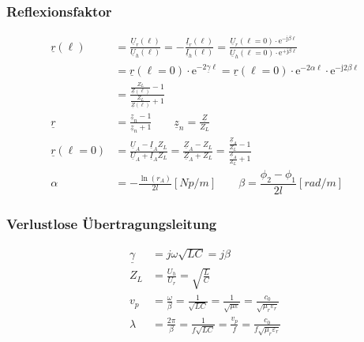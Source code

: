 \subsubsection{Reflexionsfaktor}
\begin{align*}
    \underline{r}(\ell)     & = \frac{\underline{U}_r(\ell)}{\underline{U}_h(\ell)} = -\frac{\underline{I}_r(\ell)}{\underline{I}_h(\ell)} = \frac{\underline{U}_r(\ell=0) \cdot \mathrm{e}^{-\mathrm{j} \beta \ell}}{\underline{U}_h(\ell=0) \cdot \mathrm{e}^{+\mathrm{j} \beta \ell}} \\
                            & = \underline{r}(\ell=0) \cdot \mathrm{e}^{-2 \underline{\gamma} \ell}=\underline{r}(\ell=0) \cdot \mathrm{e}^{-2 \alpha \ell} \cdot \mathrm{e}^{-\mathrm{j} 2 \beta \ell}\\
                            & = \frac{\frac{Z_L}{\underline{Z}(\ell)}-1}{\frac{Z_L}{\underline{Z}(\ell)}+1} \\
    \underline{r}           & = \frac{\underline{z}_n-1}{\underline{z}_n+1} \qquad \underline{z}_n=\frac{\underline{Z}}{Z_L}\\
    \underline{r}(\ell = 0) & = \frac{\underline{U}_A-\underline{I}_A Z_L}{\underline{U}_A + \underline{I}_A Z_L}=\frac{\underline{Z}_A-Z_L}{\underline{Z}_A+Z_L}=\frac{\frac{\underline{Z}_A}{Z_L}-1}{\frac{\underline{Z}_A}{Z_L}+1}\\
                    \alpha  & = -\frac{\ln(r_A)}{2l} [\si{Np/m}]  \qquad  \beta = \dfrac{\phi_2 -\phi_1}{2l} [\si{rad/m}]
\end{align*}

\subsubsection{Verlustlose Übertragungsleitung}
\begin{align*}
    \underline{\gamma} & = j\omega\sqrt{LC}= j\beta                                                                                           \\
    Z_L                & =\frac{U_h}{U_r}       = \sqrt{\frac{L}{C}}                                                                          \\
    v_p                & = \frac{\omega}{\beta} = \frac{1}{\sqrt{LC}}= \frac{1}{\sqrt{\mu\varepsilon}}= \frac{c_0}{\sqrt{\mu_r\varepsilon_r}} \\
    \lambda            & = \frac{2\pi}{\beta}=\frac{1}{f\sqrt{LC}}= \frac{v_p}{f}= \frac{c_0}{f\sqrt{\mu_r\varepsilon_r}}
\end{align*}


